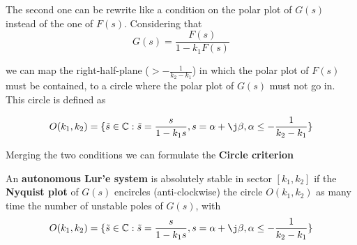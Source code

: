 The second one can be rewrite like a condition on the polar plot of $G(s)$ instead of the one of $F(s)$. Considering that
\[
    G(s) = \frac{F(s)}{1 - k_1 F(s)}
\]

we can map the right-half-plane ($>-\frac{1}{k_2 - k_1}$) in which the polar plot of $F(s)$ must be contained, to a circle where the polar plot of $G(s)$ must not go in. This circle is defined as

\[
    O(k_1,k_2) = \{\tilde{s} \in \Complex : \tilde{s} = \frac{s}{1-k_1 s}, s = \alpha + \j \beta, \alpha \leq - \frac{1}{k_2 - k_1}\}
\]

Merging the two conditions we can formulate the \textbf{Circle criterion}

\begin{theorem}
    An \textbf{autonomous Lur'e system} is absolutely stable in sector $[k_1,k_2]$ if the \textbf{Nyquist plot} of $G(s)$ encircles (anti-clockwise) the circle $O(k_1, k_2)$ as many time the number of unstable poles of $G(s)$, with
    \[
        O(k_1,k_2) = \{\tilde{s} \in \Complex : \tilde{s} = \frac{s}{1-k_1 s}, s = \alpha + \j \beta, \alpha \leq - \frac{1}{k_2 - k_1}\}
    \]
\end{theorem}